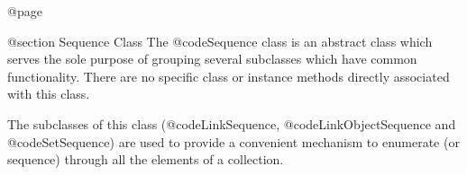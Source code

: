 @page

@section  Sequence Class
The @code{Sequence} class is an abstract class which serves the
sole purpose of grouping several subclasses which have common
functionality.  There are no specific class or instance methods
directly associated with this class.

The subclasses of this class (@code{LinkSequence},
@code{LinkObjectSequence} and @code{SetSequence}) are used to provide a
convenient mechanism to enumerate (or sequence) through all the
elements of a collection.







